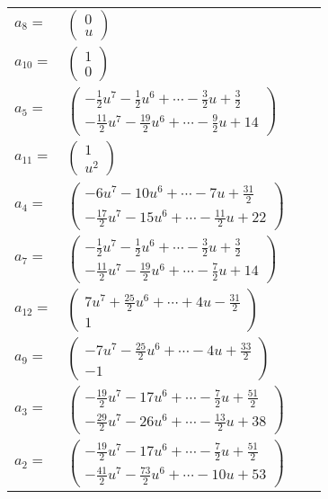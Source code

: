 \documentclass[1p]{elsarticle_modified}
\theoremstyle{definition}
\begin{document}
\begin{tabular}{m{7pt} m{180pt} m{7pt} m{180pt} }
\flushright $a_{8}=$&$\begin{pmatrix}0\\u\end{pmatrix}$ \\
\flushright $a_{10}=$&$\begin{pmatrix}1\\0\end{pmatrix}$ \\
\flushright $a_{5}=$&$\begin{pmatrix}-\frac{1}{2} u^7-\frac{1}{2} u^6+\cdots-\frac{3}{2} u+\frac{3}{2}\\-\frac{11}{2} u^7-\frac{19}{2} u^6+\cdots-\frac{9}{2} u+14\end{pmatrix}$ \\
\flushright $a_{11}=$&$\begin{pmatrix}1\\u^2\end{pmatrix}$ \\
\flushright $a_{4}=$&$\begin{pmatrix}-6 u^7-10 u^6+\cdots-7 u+\frac{31}{2}\\-\frac{17}{2} u^7-15 u^6+\cdots-\frac{11}{2} u+22\end{pmatrix}$ \\
\flushright $a_{7}=$&$\begin{pmatrix}-\frac{1}{2} u^7-\frac{1}{2} u^6+\cdots-\frac{3}{2} u+\frac{3}{2}\\-\frac{11}{2} u^7-\frac{19}{2} u^6+\cdots-\frac{7}{2} u+14\end{pmatrix}$ \\
\flushright $a_{12}=$&$\begin{pmatrix}7 u^7+\frac{25}{2} u^6+\cdots+4 u-\frac{31}{2}\\1\end{pmatrix}$ \\
\flushright $a_{9}=$&$\begin{pmatrix}-7 u^7-\frac{25}{2} u^6+\cdots-4 u+\frac{33}{2}\\-1\end{pmatrix}$ \\
\flushright $a_{3}=$&$\begin{pmatrix}-\frac{19}{2} u^7-17 u^6+\cdots-\frac{7}{2} u+\frac{51}{2}\\-\frac{29}{2} u^7-26 u^6+\cdots-\frac{13}{2} u+38\end{pmatrix}$ \\
\flushright $a_{2}=$&$\begin{pmatrix}-\frac{19}{2} u^7-17 u^6+\cdots-\frac{7}{2} u+\frac{51}{2}\\-\frac{41}{2} u^7-\frac{73}{2} u^6+\cdots-10 u+53\end{pmatrix}$ \\

\end{tabular}
\end{document}
